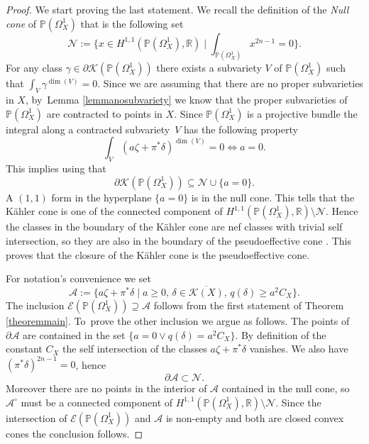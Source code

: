 \documentclass[JEP,XML,SOM,Unicode,NoEqCountersInSection,published]{cedram}
\let\mathcal\mathscr
\theoremstyle{plain}
\theoremstyle{definition}
\newcommand{\R}{\ensuremath{\mathbb{R}}}
\newcommand{\PP}{\ensuremath{\mathbb{P}}}
\begin{document}
\begin{proof}
We start proving the last statement.
We recall the definition of the \emph{Null cone} of $\PP(\Omega_X^1)$ that is the following set
\[\textstyle
\mathcal{N}:=\bigl\{x\in H^{1,1} (\PP(\Omega_X^1),\R) \mid \int_{\PP(\Omega_X^1)}x^{2n-1}=0 \bigr\}.
\]
For any class $\gamma \in \partial \mathcal{K}(\PP(\Omega_X^1))$ there exists a subvariety $V$ of $\PP(\Omega_X^1)$ such that $\int_V \gamma^{\dim(V)}=0$. Since we are assuming that there are no proper subvarieties in $X$, by~Lemma \ref{lemmanosubvariety} we know that the proper subvarieties of $\PP(\Omega_X^1)$ are contracted to points in $X$. Since $\PP(\Omega_X^1)$ is a projective bundle the integral along a contracted subvariety~$V$ has the following property
\[\int_V (a \zeta+\pi^*\delta)^{\dim(V)}=0\iff a=0.\]
This implies using \cite[Th.\,0.1]{DP04} that
\[\partial \mathcal{K}(\PP(\Omega_X^1))\subseteq \mathcal{N} \cup \{a=0\}.
\]
A $(1,1)$ form in the hyperplane $\{a=0\}$ is in the null cone. This tells that the Kähler cone is one of the connected component of $H^{1,1}(\PP(\Omega_X^1),\R)\setminus \mathcal{N}$. Hence the classes in the boundary of the Kähler cone are nef classes with trivial self intersection, so they are also in the boundary of the pseudoeffective cone \cite[Th.\,0.5]{DP04}. This proves that the closure of the Kähler cone is the pseudoeffective cone.

For notation's convenience we set
\[
\mathcal{A}:=\bigl\{ a\zeta+\pi^* \delta \mid a\geq 0,\, \delta\in \overline{\mathcal{K}(X)},\, q(\delta)\geq a^2 C_X \bigr\}.
\]
The inclusion $\mathcal{E}(\PP(\Omega_X^1)) \supseteq \mathcal{A}$ follows from the first
statement of Theorem \ref{theoremmain}.
To~prove the other inclusion we argue as follows. The points of $\partial \mathcal{A}$ are contained in the set $\{a=0 \vee q(\delta)= a^2 C_X \}$. By definition of the constant $C_X$ the self intersection of the classes $a \zeta+\pi^*\delta$ vanishes. We also have $(\pi^*\delta )^{2n-1}=0$, hence
\[\partial \mathcal{A} \subset \mathcal{N}.\]
Moreover there are no points in the interior of $\mathcal{A} $ contained in the null cone, so~$\mathcal{A}^{\circ} $ must be a connected component of $H^{1,1}(\PP(\Omega_X^1),\R)\setminus \mathcal{N}$. Since the intersection of $\mathcal{E}(\PP(\Omega_X^1))$ and $ \mathcal{A}$ is non-empty and both are closed convex cones the conclusion follows.
\end{proof}
\end{document}
